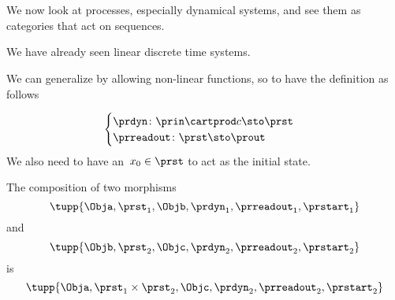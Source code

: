 
\section{}

We now look at processes, especially dynamical systems, and see them as categories that act on sequences.

We have already seen linear discrete time systems.

We can generalize by allowing non-linear functions, so to have
the definition as follows

\begin{equation}
    \begin{cases}
    \prdyn \colon \prin \cartprod c\sto \prst \\
    \prreadout \colon \prst \sto \prout
    \end{cases}
\end{equation}
We also need to have an~$x_0 \in \prst$ to act as the initial state.

The composition of two morphisms
\begin{equation}
  \tupp{\Obja,\prst_1,\Objb,\prdyn_1,\prreadout_1,\prstart_1}
\end{equation}
and
\begin{equation}
\tupp{\Objb,\prst_2,\Objc,\prdyn_2,\prreadout_2,\prstart_2}
\end{equation}
is
\begin{equation}
  \tupp{\Obja,\prst_1 \times \prst_2,\Objc,\prdyn_2,\prreadout_2,\prstart_2}
\end{equation}
%

